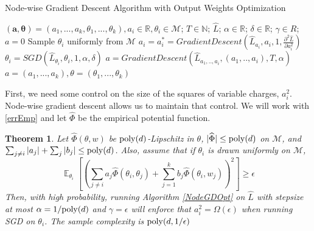 \documentclass{article}
\newtheorem{theorem}{Theorem}[section]
\newcommand{\N}{{\mathbb{N}}}
\newcommand{\R}{{\mathbb{R}}}
\DeclareMathOperator*{\expt}{\mathbb{E}}
\begin{document}
%
\begin{algorithm}[tb]
 \caption{Node-wise Gradient Descent Algorithm with Output Weights Optimization}
   \label{NodeGDOpt}
\begin{algorithmic}
  $(\boldsymbol{a,\theta}) = (a_1,...,a_k,\theta_1,...,\theta_k), a_i
  \in\R, \theta_i\in\mathcal{M}$;
  $T\in \N$; $\widehat{L}$; $\alpha\in \R$; $\delta \in \R$;
  $\gamma \in R$; \vspace{0.1in}  $a = 0$
  \REPEAT \STATE Sample $\theta_i$
  uniformly from $\mathcal{M}$
   \STATE
  $a_i = a_i^* = GradientDescent \left(\widehat{L}_{a_i}, a_i, 1,
    \frac{\partial^2 \hat{L}}{\partial a_i^2} \right)$
  \STATE
  $\theta_i = SGD \left(\widehat{L}_{\theta_i}, \theta_i,1, \alpha,\delta \right)$
   \ENDFOR
   \STATE    $a =  GradientDescent \left(\widehat{L}_{a_1,..,a_i},
     (a_1,..,a_i), T , \alpha \right)$\;
   \ENDFOR
    $a = (a_1,...,a_k), \theta = (\theta_1,..., \theta_k)$
   \end{algorithmic}
\end{algorithm}


First, we need some control on the size of the squares of variable charges, $a_i^2$. Node-wise gradient descent allows us to maintain that control. We will work with \eqref{errEmp} and let $\widehat{\Phi}$ be the empirical potential function.

\begin{theorem}\label{nonDecrease}
  Let $\widehat{\Phi}(\theta, w)$ be $\mathrm{poly}(d)$-Lipschitz in $\theta$,
  $|\widehat{\Phi}| \leq \mathrm{poly}(d)$ on $\mathcal{M}$, and $\sum_{j \neq i} |a_j| + \sum_j |b_j| \leq \mathrm{poly}(d)$. Also, assume that if $\theta_i$ is drawn uniformly on $\mathcal{M}$,
%
\[\expt_{\theta_i}\left[\left(  \sum_{j\neq i} a_j \widehat{\Phi}(\theta_i,\theta_j) + \sum_{j=1}^k b_j \widehat{\Phi}(\theta_i,w_j)\right)^2\right] \geq \epsilon \]
%
Then, with high probability, running Algorithm \ref{NodeGDOpt} on $\widehat{L}$ with stepsize at most $\alpha = 1/\mathrm{poly}(d)$ and $\gamma = \epsilon$ will enforce that $a_i^2 = \Omega(\epsilon)$ when running SGD on $\theta_i$. The sample complexity is $\mathrm{poly}(d,1/\epsilon)$
\end{theorem}
\end{document}
